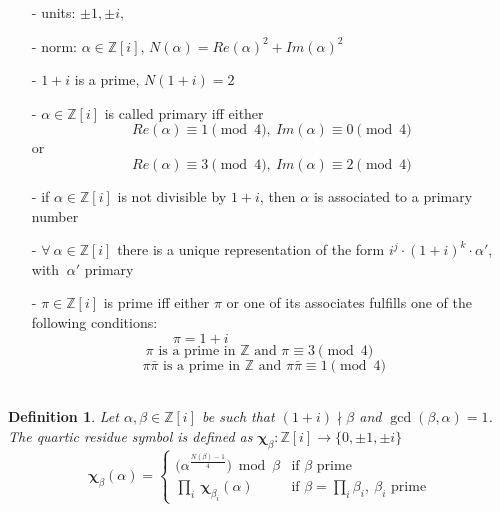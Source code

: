 \documentclass[a4paper, 11pt]{article}
\newtheorem{defi}{Definition}[section]
\begin{document}
 \begin{itemize} 
 \item[-] units: $\pm 1, \pm i, ~~$ 
 \item[-] norm: $\alpha \in \mathbb{Z}[{i}]$, $N(\alpha) = Re(\alpha)^2 + Im(\alpha)^2$ 
 \item[-] $1 + i$ is a prime, $N(1+i) = 2$ 
 \item[-] $\alpha \in \mathbb{Z}[{i}]$  is called primary iff either 
 \[Re(\alpha) \equiv 1 \pmod 4,~ Im(\alpha) \equiv 0 \pmod 4 \] or 
 \[Re(\alpha) \equiv 3 \pmod 4,~ Im(\alpha) \equiv 2 \pmod 4 \] 
 \item[-] if $\alpha \in \mathbb{Z}[{i}]$ is not divisible by $1+i$, then $\alpha$ is 
 associated to a primary number 
 \item[-] $\forall ~\alpha \in \mathbb{Z}[{i}]$ there is a unique representation of the 
 form $i^j \cdot (1+i)^k \cdot \alpha'$, with $~\alpha'$ primary 
 \item[-] $\pi \in \mathbb{Z}[{i}]$ is prime iff either $\pi$ or one of its associates fulfills one of the following conditions: 
 \[\pi = 1+i~~~~~~~~~~~~~~~~~~~~~~~~~~~~~~~~~~~~~~~~~~~~~~\] 
 \[        \pi \textrm{ is a prime in } \mathbb{Z} \textrm{ and } \pi \equiv 3\pmod 4~~~~~~~~\] 
 \[        \pi\bar{\pi} \textrm{ is a prime in } \mathbb{Z} \textrm{ and } \pi\bar{\pi} \equiv 1\pmod 4~~~~~        \] \\
 
 \end{itemize} 
 
 
 \begin {defi} 
 \emph{Let $\alpha,\beta \in \mathbb{Z}[{i}]$ be such that $(1+i) \nmid \beta$ and $\gcd(\beta,\alpha) = 1$. 
 The \emph{quartic residue symbol} is defined as $ 
 \mathbf{\chi}_{\beta} : \mathbb{Z}[{i}] \to \{ 0,\pm 1, \pm i\}$ 
 \begin{displaymath} 
 \mathbf{\chi}_{\beta}(\alpha) = \left\{ 
 \begin{array}{ll} 
     \big(\alpha^{\frac{N(\beta)-1}{4}}\big)\bmod \beta & 
         \textrm{if $\beta$ prime}\\ 
     \prod _{i} ~\mathbf{\chi}_{\beta _{i}}(\alpha) & 
         \textrm{if $\beta = \prod _ {i} \beta _{i},~ \beta_{i}$ prime} 
 \end{array} \right. 
 \end{displaymath} 
 } 
 \end{defi} 
 
\end{document}
